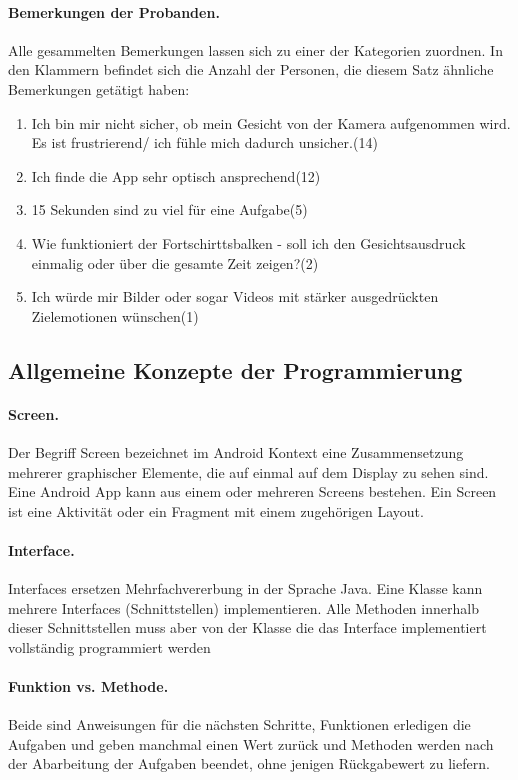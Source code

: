 \paragraph{Bemerkungen der Probanden.}Alle gesammelten Bemerkungen lassen sich zu einer der Kategorien zuordnen. In den Klammern befindet sich die Anzahl der Personen, die diesem Satz ähnliche Bemerkungen getätigt haben:
\begin{enumerate}
    \item Ich bin mir nicht sicher, ob mein Gesicht von der Kamera aufgenommen wird. Es ist frustrierend/ ich fühle mich dadurch unsicher.(14)
    \item Ich finde die App sehr optisch ansprechend(12)
    \item 15 Sekunden sind zu viel für eine Aufgabe(5)
    \item Wie funktioniert der Fortschirttsbalken - soll ich den Gesichtsausdruck einmalig oder über die gesamte Zeit zeigen?(2)
    \item Ich würde mir Bilder oder sogar Videos mit stärker ausgedrückten Zielemotionen wünschen(1)
    \label{quailtat}
\end{enumerate}

\newpage
\subsection{Allgemeine Konzepte der Programmierung}
\paragraph{Screen.}Der Begriff Screen bezeichnet im Android Kontext eine Zusammensetzung mehrerer graphischer Elemente, die auf einmal auf dem Display zu sehen sind. Eine Android App kann aus einem oder mehreren Screens bestehen. Ein Screen ist eine Aktivität oder ein Fragment mit einem zugehörigen Layout.

\paragraph{Interface.}Interfaces ersetzen Mehrfachvererbung in der Sprache Java. Eine Klasse kann mehrere Interfaces (Schnittstellen) implementieren. Alle Methoden innerhalb dieser Schnittstellen muss aber von der Klasse die das Interface implementiert vollständig programmiert werden

\paragraph{Funktion vs. Methode.}Beide sind Anweisungen für die nächsten Schritte, Funktionen erledigen die Aufgaben und geben manchmal einen Wert zurück und Methoden werden nach der Abarbeitung der Aufgaben beendet, ohne jenigen Rückgabewert zu liefern. 

